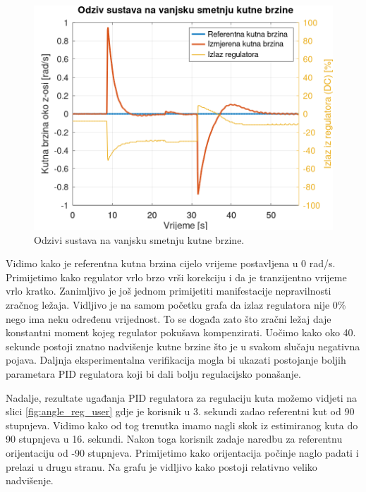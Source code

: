 \documentclass[times, utf8, diplomski, numeric]{templates/template}
\begin{document}
{{        \begin{figure}[h!]
        \centering
        \includegraphics[width=1.0\textwidth]{other/ang_vel_reg_dist.png}
        \caption{Odzivi sustava na vanjsku smetnju kutne brzine.}
        \label{fig:ang_vel_reg_dist}
        \end{figure}

        Vidimo kako je referentna kutna brzina cijelo vrijeme postavljena u 0 rad/s. Primijetimo kako regulator vrlo brzo vrši korekciju i da je tranzijentno vrijeme vrlo kratko. Zanimljivo je još jednom primijetiti manifestacije nepravilnosti zračnog ležaja. Vidljivo je na samom početku grafa da izlaz regulatora nije 0\% nego ima neku određenu vrijednost. To se događa zato što zračni ležaj daje konstantni moment kojeg regulator pokušava kompenzirati. Uočimo kako oko 40. sekunde postoji znatno nadvišenje kutne brzine što je u svakom slučaju negativna pojava. Daljnja eksperimentalna verifikacija mogla bi ukazati postojanje boljih parametara PID regulatora koji bi dali bolju regulacijsko ponašanje.

        Nadalje, rezultate ugađanja PID regulatora za regulaciju kuta možemo vidjeti na slici \ref{fig:angle_reg_user} gdje je korisnik u 3. sekundi zadao referentni kut od 90 stupnjeva. Vidimo kako od tog trenutka imamo nagli skok iz estimiranog kuta do 90 stupnjeva u 16. sekundi. Nakon toga korisnik zadaje naredbu za referentnu orijentaciju od -90 stupnjeva. Primijetimo kako orijentacija počinje naglo padati i prelazi u drugu stranu. Na grafu je vidljivo kako postoji relativno veliko nadvišenje. 

}}
\end{document}
